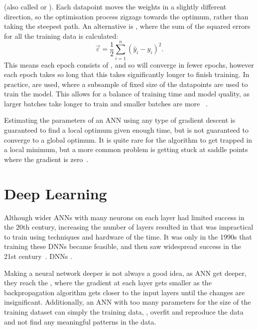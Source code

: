   (also called  or ).
Each datapoint moves the weights in a slightly different direction, so the optimisation process zigzags towards the optimum, rather than taking the steepest path.
An alternative is , where the sum of the squared errors for all the training data is calculated:
\[ \vec{\varepsilon} = \frac{1}{2} \sum_{i = 1}^{n}\left(\hat{y}_i - y_i\right)^2. \]
This means each epoch consists of , and so will converge in fewer epochs, however each epoch takes so long that this takes significantly longer to finish training.
In practice,  are used, where a subsample of fixed size of the datapoints are used to train the model.
This allows for a balance of training time and model quality, as larger batches take longer to train and smaller batches are more ~\autocite[59]{thoma2017}.

Estimating the parameters of an \ac{ANN} using any type of gradient descent is guaranteed to find a local optimum given enough time, but is not guaranteed to converge to a global optimum.
It is quite rare for the algorithm to get trapped in a local minimum, but a more common problem is getting stuck at saddle points where the gradient is zero~\autocite[438]{lecun2015}.

\section{Deep Learning} \label{sec:deep-learning}

Although wider \acp{ANN} with many neurons on each layer had limited success in the 20th century, increasing the number of layers resulted in  that was impractical to train using techniques and hardware of the time.
It was only in the 1990s that training these \acp{DNN} became feasible, and then saw widespread success in the 21st century~\autocite[86]{schmidhuber2015}.
\acp{DNN} .

Making a neural network deeper is not always a good idea, as \ac{ANN} get deeper, they reach the , where the gradient at each layer gets smaller as the backpropagation algorithm gets closer to the input layers until the changes are insignificant.
Additionally, an \ac{ANN} with too many parameters for the size of the training dataset can simply  the training data, \ie{}, overfit and reproduce the data and not find any meaningful patterns in the data.

